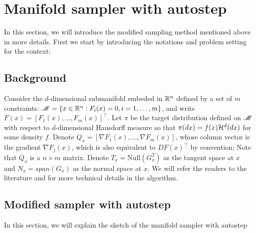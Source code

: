 \documentclass{article}
\begin{document}


\section{Manifold sampler with autostep}
In this section, we will introduce the modified sampling method mentioned above in more details. First we start by introducing the notations and problem setting for the context:
\subsection{Background}
Consider the $d$-dimensional submanifold embeded in $\mathbb R^n$ defined by a set of $m$ constraints: $\mathscr{M} = \{x \in \mathbb R^n : F_i(x) = 0, i = 1,\ldots, m\}$, and write $F(x) = [F_1(x),\ldots, F_m(x)]^\top$. Let $\pi$ be the target distribution defined on $\mathscr{M}$ with respect to $d$-dimensional Hausdorff measure so that $\pi(dx) = f(x) {\cal H}^{d}(dx)$ for some density $f$.
Denote $Q_x = [\nabla F_1(x), \ldots, \nabla F_m(x)]$, whose column vector is the gradient $\nabla F_j(x)$, which is also equivalent to $DF(x)^\top$ by convention; Note that $Q_x$ is a $n \times m$ matrix. Denote $T_x = \text{Null}(G_x^T)$ as the tangent space at $x$ and $N_x = span(G_x)$ as the normal space at $x$. We will refer the readers to the literature \cite{manifoldparent} and \cite{manifoldchild} for more technical details in the algorithm.

\subsection{Modified sampler with autostep}
In this section, we will explain the sketch of the manifold sampler with autostep
\end{document}
